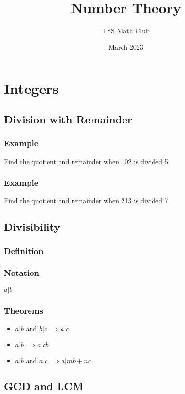 \documentclass{article}
\title{Number Theory}
\author{TSS Math Club}
\date{March 2023}
\begin{document}
\large

\maketitle

\section{Integers}
\subsection{Division with Remainder}
\subsubsection{Example}
Find the quotient and remainder when 102 is divided 5.
\vspace{20px}
\subsubsection{Example}
Find the quotient and remainder when 213 is divided 7.
\vspace{20px}
\subsection{Divisibility}
\subsubsection{Definition}
\vspace{20px}
\subsubsection{Notation}
$a|b$
\subsubsection{Theorems}
\begin{itemize}
    \item $a|b \text{ and } b|c \implies a|c$
    \item $a|b \implies a|cb$
    \item $a|b \text{ and } a|c \implies a|mb+nc$
\end{itemize}

\subsection{GCD and LCM}
\end{document}
